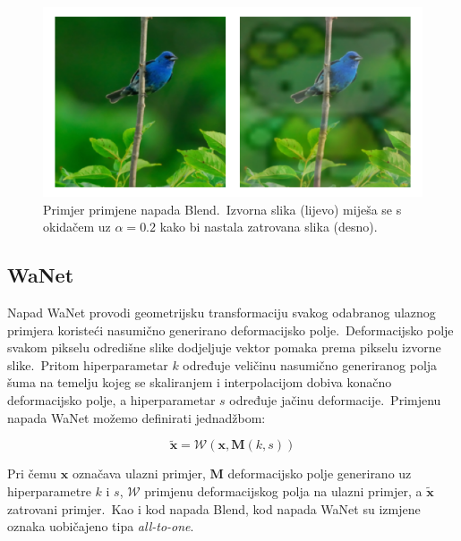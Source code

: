 \documentclass[diplomskirad]{fer}
\begin{document}
\begin{figure}[h]
  \centering
  \includegraphics[scale=0.6]{./Slike/imagenet1k_uzorak_blend.png}
  \caption{Primjer primjene napada Blend.\ Izvorna slika (lijevo) miješa se s okidačem uz $\alpha = 0.2$ kako bi nastala zatrovana slika (desno).}
  \label{fig:blend}
\end{figure}
  
\subsection{WaNet}
\label{sub:wanet}

Napad WaNet provodi geometrijsku transformaciju svakog odabranog ulaznog primjera koristeći nasumično generirano deformacijsko polje.\ Deformacijsko polje svakom pikselu odredišne slike dodjeljuje vektor pomaka prema pikselu izvorne slike.\
Pritom hiperparametar $k$ određuje veličinu nasumično generiranog polja šuma na temelju kojeg se skaliranjem i interpolacijom dobiva konačno deformacijsko polje, a hiperparametar $s$ određuje jačinu deformacije.\ 
Primjenu napada WaNet možemo definirati jednadžbom:

\begin{equation}
  \bm{\tilde{x}} = \mathcal{W}(\bm{x}, \bm{M}(k, s))
  \label{eq:wanet}
\end{equation}

\pagebreak

Pri čemu $\bm{x}$ označava ulazni primjer, $\bm{M}$ deformacijsko polje generirano uz hiperparametre $k$ i $s$, $\mathcal{W}$ primjenu deformacijskog polja na ulazni primjer, a $\bm{\tilde{x}}$ zatrovani primjer.\ 
Kao i kod napada Blend, kod napada WaNet su izmjene oznaka uobičajeno tipa \textit{all-to-one}.\ 
\end{document}
